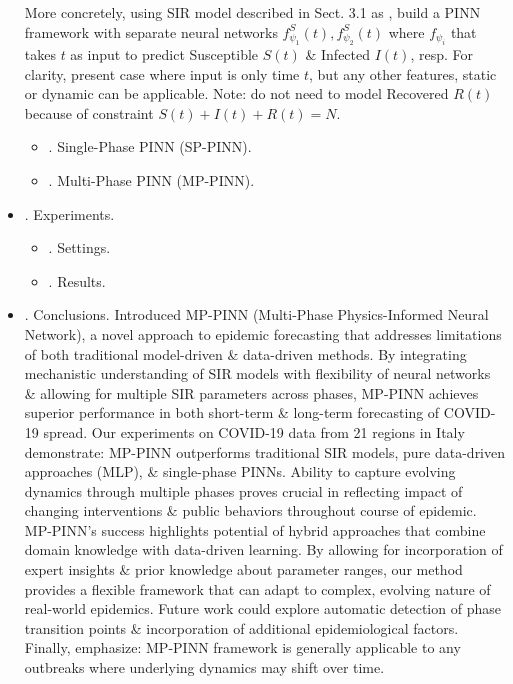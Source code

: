 \documentclass{article}
\begin{document}
\begin{itemize}
	More concretely, using SIR model described in Sect. 3.1 as , build a PINN framework with separate neural networks $f_{\psi_1}^S(t),f_{\psi_2}^S(t)$ where $f_{\psi_i}$ that takes $t$ as input to predict Susceptible $S(t)$ \& Infected $I(t)$, resp. For clarity, present case where input is only time $t$, but any other features, static or dynamic can be applicable. Note: do not need to model Recovered $R(t)$ because of constraint $S(t) + I(t) + R(t) = N$.
	\begin{itemize}
		\item {. Single-Phase PINN (SP-PINN).}
		\item {. Multi-Phase PINN (MP-PINN).}
	\end{itemize}
	\item {. Experiments.}
	\begin{itemize}
		\item {. Settings.}
		\item {. Results.}
	\end{itemize}
	\item {. Conclusions.} Introduced MP-PINN (Multi-Phase Physics-Informed Neural Network), a novel approach to epidemic forecasting that addresses limitations of both traditional model-driven \& data-driven methods. By integrating mechanistic understanding of SIR models with flexibility of neural networks \& allowing for multiple SIR parameters across phases, MP-PINN achieves superior performance in both short-term \& long-term forecasting of COVID-19 spread. Our experiments on COVID-19 data from 21 regions in Italy demonstrate: MP-PINN outperforms traditional SIR models, pure data-driven approaches (MLP), \& single-phase PINNs. Ability to capture evolving dynamics through multiple phases proves crucial in reflecting impact of changing interventions \& public behaviors throughout course of epidemic. MP-PINN's success highlights potential of hybrid approaches that combine domain knowledge with data-driven learning. By allowing for incorporation of expert insights \& prior knowledge about parameter ranges, our method provides a flexible framework that can adapt to complex, evolving nature of real-world epidemics. Future work could explore automatic detection of phase transition points \& incorporation of additional epidemiological factors. Finally, emphasize: MP-PINN framework is generally applicable to any outbreaks where underlying dynamics may shift over time.
\end{itemize}

\end{document}
